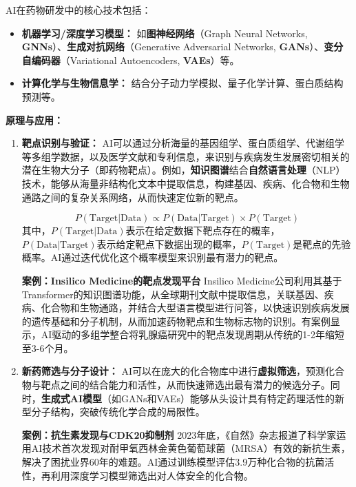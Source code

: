 \begin{itemize}
    AI在药物研发中的核心技术包括：
    \begin{itemize}
        \item \textbf{机器学习/深度学习模型：} 如\textbf{图神经网络}（Graph Neural Networks, \textbf{GNNs}）、\textbf{生成对抗网络}（Generative Adversarial Networks, \textbf{GANs}）、\textbf{变分自编码器}（Variational Autoencoders, \textbf{VAEs}）等。
        \item \textbf{计算化学与生物信息学：} 结合分子动力学模拟、量子化学计算、蛋白质结构预测等。
    \end{itemize}

    \textbf{原理与应用：}

    \begin{enumerate}
        \item \textbf{靶点识别与验证：} AI可以通过分析海量的基因组学、蛋白质组学、代谢组学等多组学数据，以及医学文献和专利信息，来识别与疾病发生发展密切相关的潜在生物大分子（即药物靶点）。例如，\textbf{知识图谱}结合\textbf{自然语言处理}（NLP）技术，能够从海量非结构化文本中提取信息，构建基因、疾病、化合物和生物通路之间的复杂关系网络，从而快速定位新的靶点。

        $$
        P(\text{Target} | \text{Data}) \propto P(\text{Data} | \text{Target}) \times P(\text{Target})
        $$
        其中，$P(\text{Target} | \text{Data})$表示在给定数据下靶点存在的概率，$P(\text{Data} | \text{Target})$表示给定靶点下数据出现的概率，$P(\text{Target})$是靶点的先验概率。AI通过迭代优化这个概率模型来识别最有潜力的靶点。

        \textbf{案例：Insilico Medicine的靶点发现平台}
        Insilico Medicine公司利用其基于Transformer的知识图谱功能，从全球期刊文献中提取信息，关联基因、疾病、化合物和生物通路，并结合大型语言模型进行问答，以快速识别疾病发展的遗传基础和分子机制，从而加速药物靶点和生物标志物的识别。有案例显示，AI驱动的多组学整合将乳腺癌研究中的靶点发现周期从传统的1-2年缩短至3-6个月。

        \item \textbf{新药筛选与分子设计：} AI可以在庞大的化合物库中进行\textbf{虚拟筛选}，预测化合物与靶点之间的结合能力和活性，从而快速筛选出最有潜力的候选分子。同时，\textbf{生成式AI模型}（如GANs和VAEs）能够从头设计具有特定药理活性的新型分子结构，突破传统化学合成的局限性。

        \textbf{案例：抗生素发现与CDK20抑制剂}
        2023年底，《自然》杂志报道了科学家运用AI技术首次发现对耐甲氧西林金黄色葡萄球菌（MRSA）有效的新抗生素，解决了困扰业界60年的难题。AI通过训练模型评估3.9万种化合物的抗菌活性，再利用深度学习模型筛选出对人体安全的化合物。


\end{enumerate}
\end{itemize}
